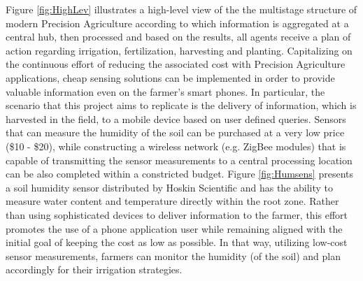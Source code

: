 \documentclass{article}
\begin{document}
\noindent Figure \ref{fig:HighLev} illustrates a high-level view of the the multistage structure of modern Precision Agriculture according to which information is aggregated at a central hub, then processed and based on the results, all agents receive a plan of action regarding irrigation, fertilization, harvesting and planting.  Capitalizing on the continuous effort of reducing the associated cost with Precision Agriculture applications, cheap sensing solutions can be implemented in order to provide valuable information even on the farmer's smart phones. In particular, the scenario that this project aims to replicate is the delivery of information, which is harvested in the field, to a mobile device based on user defined queries. Sensors that can measure the humidity of the soil can be purchased at a very low price (\$10 - \$20), while constructing a wireless network
(e.g. ZigBee modules) that is capable of transmitting
the sensor measurements to a central processing location can be also completed within a constricted budget.
Figure \ref{fig:Humsens} presents a soil humidity sensor distributed by Hoskin Scientific and has the ability to measure water content and temperature directly within the root zone. Rather than using sophisticated devices to deliver information to the farmer, this effort promotes the use of a phone application user while remaining aligned with the initial goal of keeping the cost as low as possible. In that way, utilizing low-cost sensor measurements, farmers can monitor the humidity (of the soil) and plan accordingly for their irrigation strategies.
\end{document}
